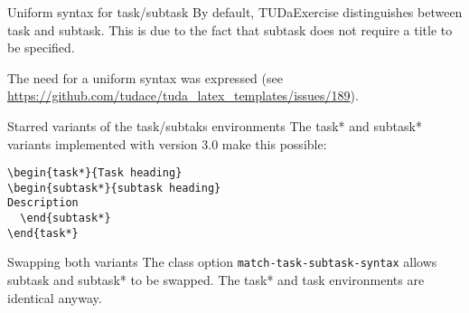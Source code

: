 \documentclass[
	english,%
	accentcolor=9c,%
	points=true, to activate referencing task properties
]{tudaexercise}
\newcommand*{\code}[1]{\texttt{#1}}
\begin{document}
\begin{task*}{Uniform syntax for task/subtask}
	\label{task-subtask-syntax}
	By default, TUDaExercise distinguishes between task and subtask. This is due to the fact that subtask does
	not require a title to be specified.

	The need for a uniform syntax was expressed (see \url{https://github.com/tudace/tuda_latex_templates/issues/189}).

	\begin{subtask*}{Starred variants of the task/subtaks environments}
		The task* and subtask* variants implemented with version 3.0 make this possible:

\begin{verbatim}
\begin{task*}{Task heading}
\begin{subtask*}{subtask heading}
Description
  \end{subtask*}
\end{task*}
\end{verbatim}
	\end{subtask*}

	\begin{subtask*}{Swapping both variants}
		The class option \code{match-task-subtask-syntax} allows subtask and subtask* to be swapped. The task* and task environments are identical anyway.
	\end{subtask*}
\end{task*}
\end{document}
